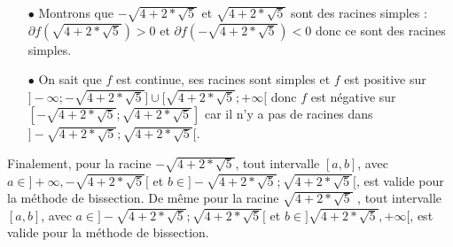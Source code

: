 \documentclass[a4paper, 12pt]{article}
\begin{document}
\begin{itemize}
\begin{itemize}
	\item[$\bullet$] Montrons que $-\sqrt{4 + 2 * \sqrt{5}}$ et $\sqrt{4 + 2 * \sqrt{5}}$ sont des racines simples :\\
	$\partial f(\sqrt{4 + 2 * \sqrt{5}}) > 0 $ et $\partial f(-\sqrt{4 + 2 * \sqrt{5}}) < 0$ donc ce sont des racines simples.
	\item[$\bullet$] On sait que $f$ est continue, ses racines sont simples et $f$ est positive sur \( ] -\infty ; -\sqrt{4 + 2 * \sqrt{5}} ] \cup [ \sqrt{4 + 2 * \sqrt{5}} ; +\infty [ \) donc $f$ est négative sur $ [ -\sqrt{4 + 2 * \sqrt{5}} ; \sqrt{4 + 2 * \sqrt{5}} ] $ car il n'y a pas de racines dans $ ] -\sqrt{4 + 2 * \sqrt{5}} ; \sqrt{4 + 2 * \sqrt{5}} [ $.
\end{itemize}

\end{itemize}
Finalement, pour la racine $-\sqrt{4 + 2 * \sqrt{5}}$, tout intervalle $[a,b]$, avec $a\in ]+\infty,-\sqrt{4 + 2 * \sqrt{5}}[$ et $ b\in ] -\sqrt{4 + 2 * \sqrt{5}} ; \sqrt{4 + 2 * \sqrt{5}} [$, est valide pour la méthode de bissection. De même pour la racine $\sqrt{4 + 2 * \sqrt{5}}$ , tout intervalle $[a,b]$, avec $a\in ] -\sqrt{4 + 2 * \sqrt{5}} ; \sqrt{4 + 2 * \sqrt{5}} [$ et $b\in ]\sqrt{4 + 2 * \sqrt{5}},+\infty[$, est valide pour la méthode de bissection.
\newpage
\end{document}
